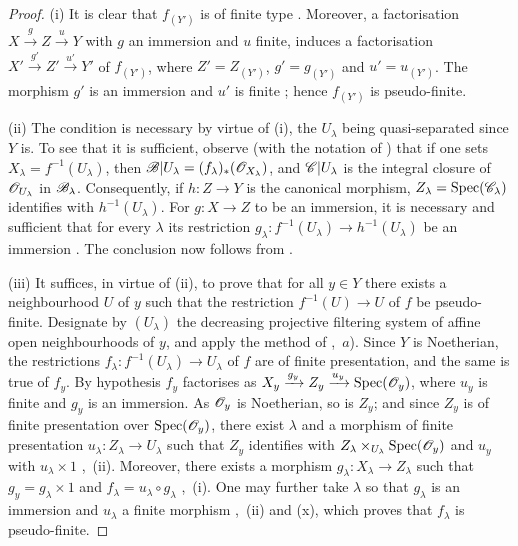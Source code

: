 \begin{proof}
(i) It is clear that $f_{(Y')}$ is of finite type . Moreover, a factorisation $X\xrightarrow{g}Z\xrightarrow{u}Y$ with $g$ an immersion and $u$ finite, induces a factorisation $X'\xrightarrow{g'}Z'\xrightarrow{u'}Y'$ of $f_{(Y')}$, where $Z'=Z_{(Y')}$, $g'=g_{(Y')}$ and $u'=u_{(Y')}$. The morphism $g'$ is an immersion  and $u'$ is finite ; hence $f_{(Y')}$ is pseudo-finite.

(ii) The condition is necessary by virtue of (i), the $U_\lambda$ being quasi-separated since $Y$ is.
To see that it is sufficient, observe (with the notation of ) that if one sets $X_\lambda=f^{-1}(U_\lambda)$, then $\mathscr{B}|U_\lambda=(f_\lambda)_*(\mathscr{O}_{X_\lambda})$, and $\mathscr{C}|U_\lambda$ is the integral closure of $\mathscr{O}_{U_\lambda}$ in $\mathscr{B}_\lambda$. Consequently, if $h:Z\to Y$ is the canonical morphism, $Z_\lambda=\operatorname{Spec}(\mathscr{C}_\lambda)$ identifies with $h^{-1}(U_\lambda)$. For $g:X\to Z$ to be an immersion, it is necessary and sufficient that for every $\lambda$ its restriction $g_\lambda:f^{-1}(U_\lambda)\to h^{-1}(U_\lambda)$ be an immersion . The conclusion now follows from .

(iii) It suffices, in virtue of (ii), to prove that for all $y\in Y$ there exists a neighbourhood $U$ of $y$ such that the restriction $f^{-1}(U)\to U$ of $f$ be pseudo-finite.
Designate by $(U_\lambda)$ the decreasing projective filtering system of affine open neighbourhoods of $y$, and apply the method of ,~$a$).
Since $Y$ is Noetherian, the restrictions $f_\lambda:f^{-1}(U_\lambda)\to U_\lambda$ of $f$ are of finite presentation, and the same is true of $f_y$.
By hypothesis $f_y$ factorises as $X_y\xrightarrow{g_y}Z_y\xrightarrow{u_y}\operatorname{Spec}(\mathscr{O}_y)$, where $u_y$ is finite and $g_y$ is an immersion.
As $\mathscr{O}_y$ is Noetherian, so is $Z_y$; and since $Z_y$ is of finite presentation over $\operatorname{Spec}(\mathscr{O}_y)$, there exist $\lambda$ and a morphism of finite presentation $u_\lambda:Z_\lambda\to U_\lambda$ such that $Z_y$ identifies with $Z_\lambda\times_{U_\lambda}\operatorname{Spec}(\mathscr{O}_y)$ and $u_y$ with $u_\lambda\times 1$ ,~(ii). Moreover, there exists a morphism $g_\lambda:X_\lambda\to Z_\lambda$ such that $g_y=g_\lambda\times 1$ and $f_\lambda=u_\lambda\circ g_\lambda$ ,~(i). One may further take $\lambda$ so that $g_\lambda$ is an immersion and $u_\lambda$ a finite morphism ,~(ii) and (x), which proves that $f_\lambda$ is pseudo-finite.
\end{proof}

